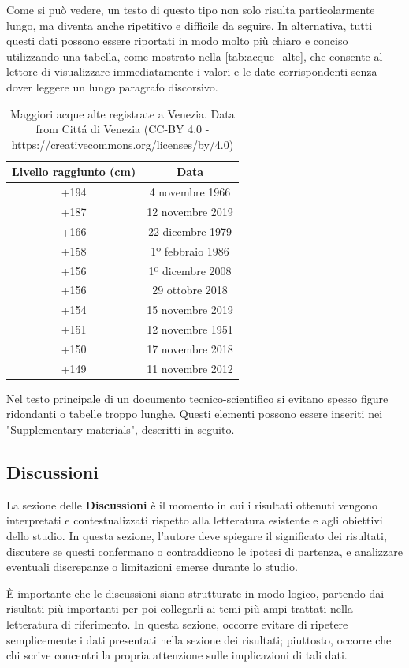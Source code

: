 \documentclass[9pt,a4paper,twoside]{rho-class/rho}
\begin{document}
Come si può vedere, un testo di questo tipo non solo risulta particolarmente lungo, ma diventa anche ripetitivo e difficile da seguire. In alternativa, tutti questi dati possono essere riportati in modo molto più chiaro e conciso utilizzando una tabella, come mostrato nella \autoref{tab:acque_alte}, che consente al lettore di visualizzare immediatamente i valori e le date corrispondenti senza dover leggere un lungo paragrafo discorsivo.

\begin{table}[h!]
\centering
\begin{tabular}{cc}
\hline
\textbf{Livello raggiunto (cm)} & \textbf{Data} \\ \hline
+194 & 4 novembre 1966 \\ 
+187 & 12 novembre 2019 \\
+166 & 22 dicembre 1979 \\
+158 & 1º febbraio 1986 \\
+156 & 1º dicembre 2008 \\
+156 & 29 ottobre 2018 \\
+154 & 15 novembre 2019 \\
+151 & 12 novembre 1951 \\
+150 & 17 novembre 2018 \\
+149 & 11 novembre 2012 \\ \hline
\end{tabular}
\caption{Maggiori acque alte registrate a Venezia. Data from Cittá di Venezia (CC-BY 4.0 - https://creativecommons.org/licenses/by/4.0)}
\label{tab:acque_alte}
\end{table}

Nel testo principale di un documento tecnico-scientifico si evitano spesso figure ridondanti o tabelle troppo lunghe. Questi elementi possono essere inseriti nei "Supplementary materials", descritti in seguito.

\subsection{Discussioni}
La sezione delle \textbf{Discussioni} è il momento in cui i risultati ottenuti vengono interpretati e contestualizzati rispetto alla letteratura esistente e agli obiettivi dello studio. In questa sezione, l’autore deve spiegare il significato dei risultati, discutere se questi confermano o contraddicono le ipotesi di partenza, e analizzare eventuali discrepanze o limitazioni emerse durante lo studio.

È importante che le discussioni siano strutturate in modo logico, partendo dai risultati più importanti per poi collegarli ai temi più ampi trattati nella letteratura di riferimento. In questa sezione, occorre evitare di ripetere semplicemente i dati presentati nella sezione dei risultati; piuttosto, occorre che chi scrive concentri la propria attenzione sulle implicazioni di tali dati.
\end{document}
